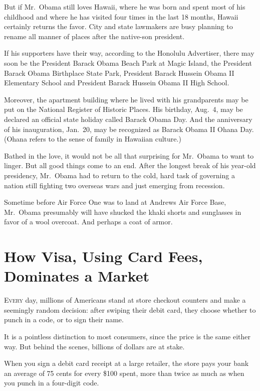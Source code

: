 ﻿\documentclass[12pt]{article}
\begin{document}
But if Mr.~Obama still loves Hawaii, where he was born and spent most of his childhood and where he
has visited four times in the last 18 months, Hawaii certainly returns the favor. City and state
lawmakers are busy planning to rename all manner of places after the native-son president.

If his supporters have their way, according to the Honolulu Advertiser, there may soon be the
President Barack Obama Beach Park at Magic Island, the President Barack Obama Birthplace State Park,
President Barack Hussein Obama II Elementary School and President Barack Hussein Obama II High
School.

Moreover, the apartment building where he lived with his grandparents may be put on the National
Register of Historic Places. His birthday, Aug.~4, may be declared an official state holiday called
Barack Obama Day. And the anniversary of his inauguration, Jan.~20, may be recognized as Barack
Obama II Ohana Day. (Ohana refers to the sense of family in Hawaiian culture.)

Bathed in the love, it would not be all that surprising for Mr.~Obama to want to linger. But all
good things come to an end. After the longest break of his year-old presidency, Mr.~Obama had to
return to the cold, hard task of governing a nation still fighting two overseas wars and just
emerging from recession.

Sometime before Air Force One was to land at Andrews Air Force Base, Mr.~Obama presumably will have
shucked the khaki shorts and sunglasses in favor of a wool overcoat. And perhaps a coat of armor.

\section{How Visa, Using Card Fees, Dominates a Market}

\lettrine{E}{very} day, millions of Americans stand at store checkout
counters and make a seemingly random decision: after swiping their debit card, they choose whether
to punch in a code, or to sign their name.

It is a pointless distinction to most consumers, since the price is the same either way. But behind
the scenes, billions of dollars are at stake.

When you sign a debit card receipt at a large retailer, the store pays your bank an average of 75
cents for every \$100 spent, more than twice as much as when you punch in a four-digit code.
\end{document}
